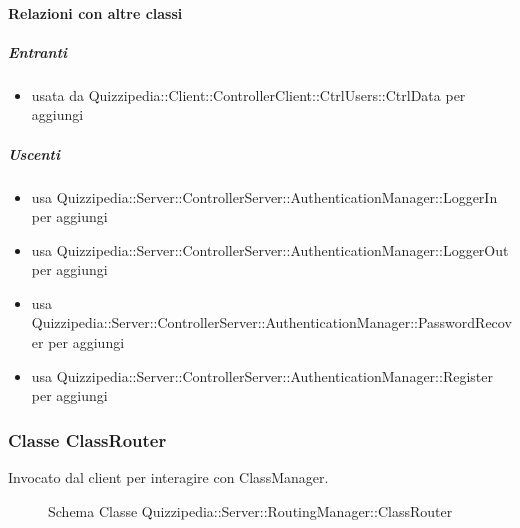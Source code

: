 \paragraph{Relazioni con altre classi}
\subparagraph{Entranti}
\begin{itemize}
\item usata da Quizzipedia::Client::ControllerClient::CtrlUsers::CtrlData per aggiungi
\end{itemize}
\subparagraph{Uscenti}
\begin{itemize}
\item usa Quizzipedia::Server::ControllerServer::AuthenticationManager::LoggerIn per aggiungi
\item usa Quizzipedia::Server::ControllerServer::AuthenticationManager::LoggerOut per aggiungi
\item usa Quizzipedia::Server::ControllerServer::AuthenticationManager::PasswordRecover per aggiungi
\item usa Quizzipedia::Server::ControllerServer::AuthenticationManager::Register per aggiungi
\end{itemize}
\subsubsection{Classe ClassRouter}
Invocato dal client per interagire con ClassManager.
\begin{figure}[H]
\centering
\noindent{}
\caption[Schema Classe ClassRouter]{Schema Classe Quizzipedia::Server::RoutingManager::ClassRouter}
\end{figure}
